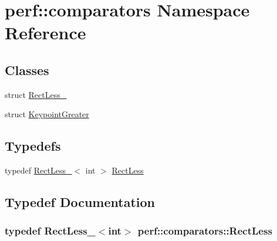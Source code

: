 \hypertarget{namespaceperf_1_1comparators}{\section{perf\-:\-:comparators Namespace Reference}
\label{namespaceperf_1_1comparators}
}
\subsection*{Classes}
\begin{DoxyCompactItemize}
\item 
struct \hyperlink{structperf_1_1comparators_1_1RectLess__}{Rect\-Less\-\_\-}
\item 
struct \hyperlink{structperf_1_1comparators_1_1KeypointGreater}{Keypoint\-Greater}
\end{DoxyCompactItemize}
\subsection*{Typedefs}
\begin{DoxyCompactItemize}
\item 
typedef \hyperlink{structperf_1_1comparators_1_1RectLess__}{Rect\-Less\-\_\-}$<$ int $>$ \hyperlink{namespaceperf_1_1comparators_a9cfc2ea4244df9925a86eeec857f9aac}{Rect\-Less}
\end{DoxyCompactItemize}


\subsection{Typedef Documentation}
\hypertarget{namespaceperf_1_1comparators_a9cfc2ea4244df9925a86eeec857f9aac}{
\subsubsection[{Rect\-Less}]{\setlength{\rightskip}{0pt plus 5cm}typedef {\bf Rect\-Less\-\_\-}$<$int$>$ {\bf perf\-::comparators\-::\-Rect\-Less}}}\label{namespaceperf_1_1comparators_a9cfc2ea4244df9925a86eeec857f9aac}
